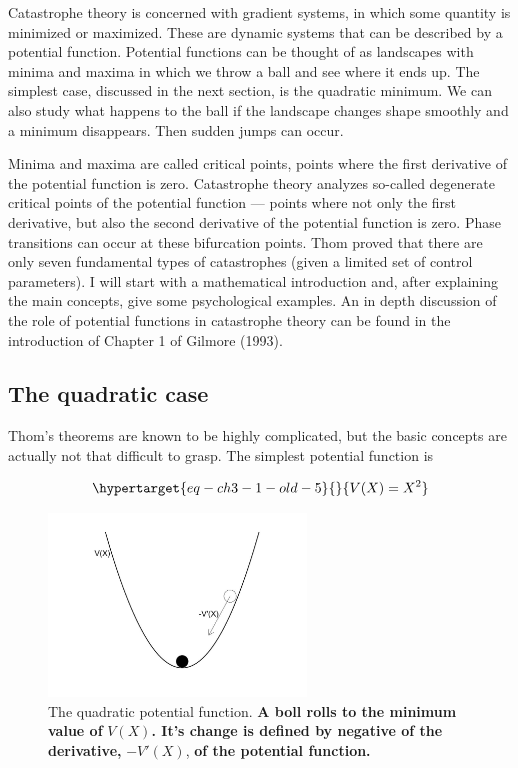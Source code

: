 \documentclass[
  letterpaper,
]{scrbook}
\begin{document}
Catastrophe theory is concerned with gradient systems, in which some
quantity is minimized or maximized. These are dynamic systems that can
be described by a potential function. Potential functions can be thought
of as landscapes with minima and maxima in which we throw a ball and see
where it ends up. The simplest case, discussed in the next section, is
the quadratic minimum. We can also study what happens to the ball if the
landscape changes shape smoothly and a minimum disappears. Then sudden
jumps can occur.

Minima and maxima are called critical points, points where the first
derivative of the potential function is zero. Catastrophe theory
analyzes so-called degenerate critical points of the potential function
--- points where not only the first derivative, but also the second
derivative of the potential function is zero. Phase transitions can
occur at these bifurcation points. Thom proved that there are only seven
fundamental types of catastrophes (given a limited set of control
parameters). I will start with a mathematical introduction and, after
explaining the main concepts, give some psychological examples. An in
depth discussion of the role of potential functions in catastrophe
theory can be found in the introduction of Chapter 1 of Gilmore (1993).

\hypertarget{the-quadratic-case}{%
\subsection{The quadratic case}\label{the-quadratic-case}}

Thom's theorems are known to be highly complicated, but the basic
concepts are actually not that difficult to grasp. The simplest
potential function is

\begin{equation}\protect\hypertarget{eq-ch3-1-old-5}{}{
V(X) = X^{2}
}\label{eq-ch3-1-old-5}\end{equation}

\begin{figure}

{\centering \includegraphics[width=2.69542in,height=1.91728in]{media/ch3/image3.jpg}

}

\caption{\label{fig-ch3-img3-old-15}The quadratic potential function.
\textbf{A boll rolls to the minimum value of} \(V(X)\)\textbf{. It's
change is defined by negative of the derivative,} \(-V'(X)\), \textbf{of
the potential function.}}

\end{figure}
\end{document}
